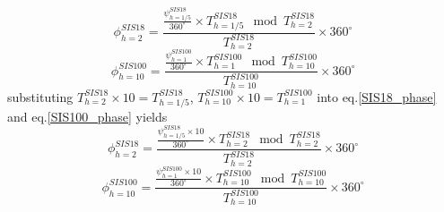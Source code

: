 \begin{equation}
\phi_{h=2}^{SIS18} =  \frac {\frac{\psi_{h=1/5}^{SIS18}}{360^\circ}\times {T_{h=1/5}^{SIS18}} \mod {T_{h=2}^{SIS18}}}{T_{h=2}^{SIS18}}\times {360^\circ} \label{SIS18_phase}
\end{equation}
\begin{equation}
\phi_{h=10}^{SIS100} =  \frac {\frac{\psi_{h=1}^{SIS100}}{360^\circ}\times {T_{h=1}^{SIS100}} \mod {T_{h=10}^{SIS100}}}{T_{h=10}^{SIS100}}\times {360^\circ} \label{SIS100_phase}
\end{equation}
substituting $T_{h=2}^{SIS18}\times 10=T_{h=1/5}^{SIS18}$, $T_{h=10}^{SIS100}\times 10=T_{h=1}^{SIS100}$ into eq.\ref{SIS18_phase} and eq.\ref{SIS100_phase} yields
 \begin{equation}
\phi_{h=2}^{SIS18} =  \frac {\frac{\psi_{h=1/5}^{SIS18}\times 10}{360^\circ}\times {T_{h=2}^{SIS18}} \mod {T_{h=2}^{SIS18}}}{T_{h=2}^{SIS18}}\times {360^\circ} \label{SIS18_phase1}
\end{equation}
\begin{equation}
\phi_{h=10}^{SIS100} =  \frac {\frac{\psi_{h=1}^{SIS100}\times 10}{360^\circ}\times {T_{h=10}^{SIS100}} \mod {T_{h=10}^{SIS100}}}{T_{h=10}^{SIS100}}\times {360^\circ} \label{SIS100_phase1}
\end{equation}

